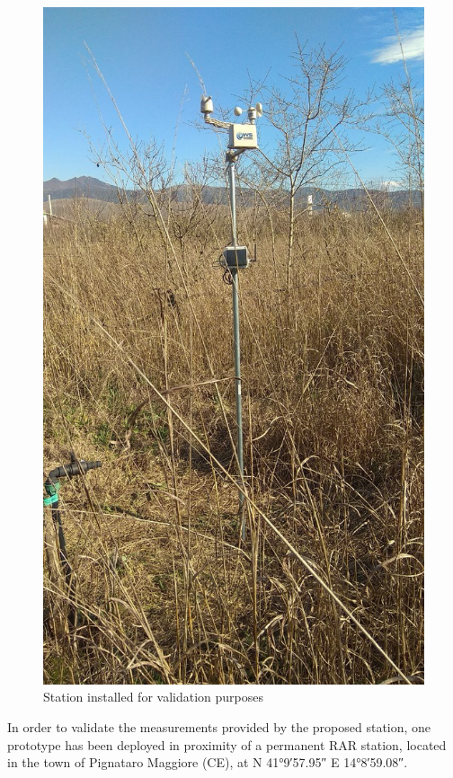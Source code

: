\documentclass[conference]{IEEEtran}
\begin{document}
\begin{figure}
    \centering
    \includegraphics[scale=.25]{deployment_pignataro.jpg}
    \caption{Station installed for validation purposes}
    \label{fig:deployment}
\end{figure}


In order to validate the measurements provided by the proposed station, one prototype has been deployed in proximity of a permanent RAR station, located in the town of Pignataro Maggiore (CE), at N \ang{41;9;57.95} E \ang{14;8;59.08}.
\end{document}
